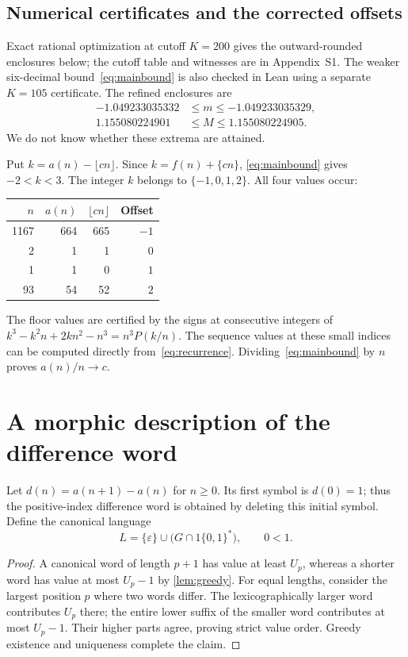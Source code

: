\documentclass[11pt,a4paper]{article}
\numberwithin{equation}{section}
\newtheorem{lemma}[theorem]{Lemma}
\theoremstyle{remark}
\newcommand{\eps}{\varepsilon}
\begin{document}
\subsection{Numerical certificates and the corrected offsets}
Exact rational optimization at cutoff $K=200$ gives the outward-rounded
enclosures below; the cutoff table and witnesses are in Appendix~S1.
The weaker six-decimal bound~\eqref{eq:mainbound} is also checked in Lean
using a separate $K=105$ certificate. The refined enclosures are
\begin{align}
 -1.049233035332&\le m\le-1.049233035329,\label{eq:minnum}\\
  1.155080224901&\le M\le 1.155080224905.\label{eq:maxnum}
\end{align}
We do not know whether these extrema are attained.

Put $k=a(n)-\lfloor cn\rfloor$. Since
$k=f(n)+\{cn\}$, \eqref{eq:mainbound} gives $-2<k<3$.
The integer $k$ belongs to $\{-1,0,1,2\}$. All four values occur:
\begin{center}
\begin{tabular}{rrrr}
\toprule
$n$ & $a(n)$ & $\lfloor cn\rfloor$ & Offset\\
\midrule
1167 & 664 & 665 & $-1$\\
2 & 1 & 1 & $0$\\
1 & 1 & 0 & $1$\\
93 & 54 & 52 & $2$\\
\bottomrule
\end{tabular}
\end{center}
The floor values are certified by the signs at consecutive integers of
$k^3-k^2n+2kn^2-n^3=n^3P(k/n)$. The sequence values at these small
indices can be computed directly from~\eqref{eq:recurrence}.
Dividing~\eqref{eq:mainbound} by $n$ proves $a(n)/n\to c$.

\section{A morphic description of the difference word}\label{sec:morphic}
Let $d(n)=a(n+1)-a(n)$ for $n\ge0$. Its first symbol is $d(0)=1$;
thus the positive-index difference word is obtained by deleting this initial
symbol. Define the canonical language
\[
 L=\{\eps\}\cup\bigl(G\cap1\{0,1\}^*\bigr),\qquad 0<1.
\]

\begin{proof}
A canonical word of length $p+1$ has value at least $U_p$, whereas a shorter
word has value at most $U_p-1$ by \cref{lem:greedy}. For equal lengths,
consider the largest position $p$ where two words differ. The lexicographically
larger word contributes $U_p$ there; the entire lower suffix of the smaller
word contributes at most $U_p-1$. Their higher parts agree, proving strict
value order. Greedy existence and uniqueness complete the claim.
\end{proof}
\end{document}
